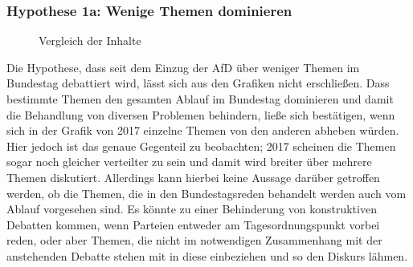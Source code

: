 \subsubsection{Hypothese 1a: Wenige Themen dominieren}
\begin{figure} [h]
	\caption{Vergleich der Inhalte}
\end{figure}

Die Hypothese, dass seit dem Einzug der AfD über weniger Themen im Bundestag debattiert wird, lässt sich aus den Grafiken nicht erschließen. Dass bestimmte Themen den gesamten Ablauf im Bundestag dominieren und damit die Behandlung von diversen Problemen behindern, ließe sich bestätigen, wenn sich in der Grafik von 2017 einzelne Themen von den anderen abheben würden. Hier jedoch ist das genaue Gegenteil zu beobachten; 2017 scheinen die Themen sogar noch gleicher verteilter zu sein und damit wird breiter über mehrere Themen diskutiert. Allerdings kann hierbei keine Aussage darüber getroffen werden, ob die Themen, die in den Bundestagsreden behandelt werden auch vom Ablauf vorgesehen sind. Es könnte zu einer Behinderung von konstruktiven Debatten kommen, wenn Parteien entweder am Tagesordnungspunkt vorbei reden, oder aber Themen, die nicht im notwendigen Zusammenhang mit der anstehenden Debatte stehen mit in diese einbeziehen und so den Diskurs lähmen.  


